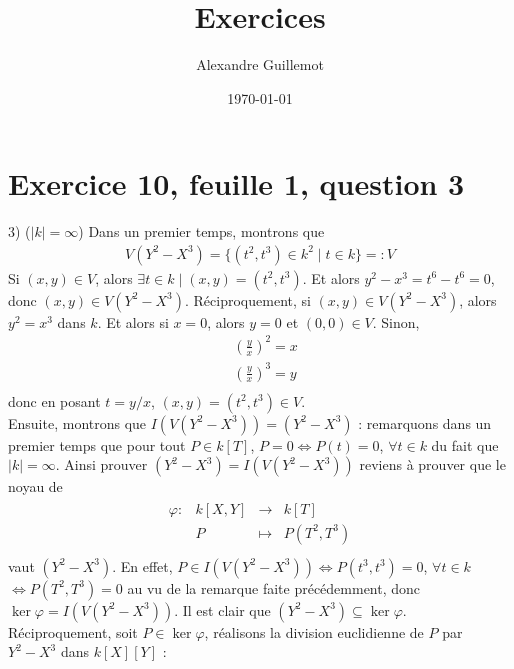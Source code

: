 \documentclass[11pt]{article}
\begin{document}
\title{Exercices}
\date{\today}
\author{Alexandre Guillemot}
\maketitle

\section*{Exercice 10, feuille 1, question 3}
    \begin{question}{3)} ($|k| = \infty$)
        Dans un premier temps, montrons que
        \begin{align*}
            V(Y^2 - X^3) = \{(t^2, t^3) \in k^2 \mid t \in k\} =: V
        \end{align*}
        Si $(x,y) \in V$, alors $\exists t \in k \mid (x,y) = (t^2, t^3)$. Et alors $y^2 - x^3 = t^6 - t^6 = 0$, donc $(x,y) \in V(Y^2 - X^3)$. Réciproquement, si $(x,y) \in V(Y^2 - X^3)$, alors $y^2 = x^3$ dans $k$. Et alors si $x = 0$, alors $y = 0$ et $(0,0) \in V$. Sinon,
        \begin{align*}
            &\left(\frac{y}{x}\right)^2 = x \\
            &\left(\frac{y}{x}\right)^3 = y \\
        \end{align*}
        donc en posant $t = y/x$, $(x,y) = (t^2, t^3) \in V$. \\
        Ensuite, montrons que $I(V(Y^2 - X^3)) = (Y^2 - X^3)$ : remarquons dans un premier temps que pour tout $P \in k[T]$, $P = 0 \iff P(t) = 0$, $\forall t \in k$ du fait que $|k| = \infty$. Ainsi prouver $(Y^2 - X^3) = I(V(Y^2 - X^3))$ reviens à prouver que le noyau de
        \begin{align*}
            \begin{array}{cccc}
                \varphi : & k[X,Y] & \to & k[T] \\
                & P & \mapsto & P(T^2,T^3) \\
            \end{array}
        \end{align*}
        vaut $(Y^2 - X^3)$. En effet, $P \in I(V(Y^2 - X^3)) \iff P(t^3, t^3) = 0$, $\forall t \in k$ $\iff P(T^2, T^3) = 0$ au vu de la remarque faite précédemment, donc $\ker \varphi = I(V(Y^2 - X^3))$. Il est clair que $(Y^2 - X^3) \subseteq \ker \varphi$. Réciproquement, soit $P \in \ker \varphi$, réalisons la division euclidienne de $P$ par $Y^2 - X^3$ dans $k[X][Y]$ :
        \begin{align*}

\end{align*}
\end{question}
\end{document}
